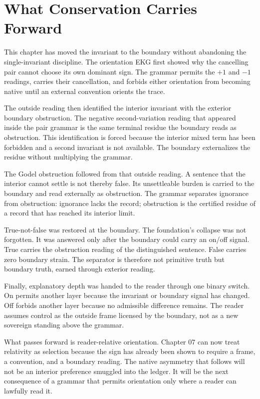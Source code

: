 \section{What Conservation Carries Forward}

This chapter has moved the invariant to the boundary without abandoning the
single-invariant discipline. The orientation EKG first showed why the
cancelling pair cannot choose its own dominant sign. The grammar permits the
\(+1\) and \(-1\) readings, carries their cancellation, and forbids either
orientation from becoming native until an external convention orients the
trace.

The outside reading then identified the interior invariant with the exterior
boundary obstruction. The negative second-variation reading that appeared
inside the pair grammar is the same terminal residue the boundary reads as
obstruction. This identification is forced because the interior mixed term
has been forbidden and a second invariant is not available. The boundary
externalizes the residue without multiplying the grammar.

The Godel obstruction followed from that outside reading. A sentence that the
interior cannot settle is not thereby false. Its unsettleable burden is
carried to the boundary and read externally as obstruction. The grammar
separates ignorance from obstruction: ignorance lacks the record; obstruction
is the certified residue of a record that has reached its interior limit.

True-not-false was restored at the boundary. The foundation's collapse was
not forgotten. It was answered only after the boundary could carry an on/off
signal. True carries the obstruction reading of the distinguished sentence.
False carries zero boundary strain. The separator is therefore not primitive
truth but boundary truth, earned through exterior reading.

Finally, explanatory depth was handed to the reader through one binary
switch. On permits another layer because the invariant or boundary signal has
changed. Off forbids another layer because no admissible difference remains.
The reader assumes control as the outside frame licensed by the boundary, not
as a new sovereign standing above the grammar.

What passes forward is reader-relative orientation. Chapter 07 can now treat
relativity as selection because the sign has already been shown to require a
frame, a convention, and a boundary reading. The native asymmetry that follows
will not be an interior preference smuggled into the ledger. It will be the
next consequence of a grammar that permits orientation only where a reader
can lawfully read it.
